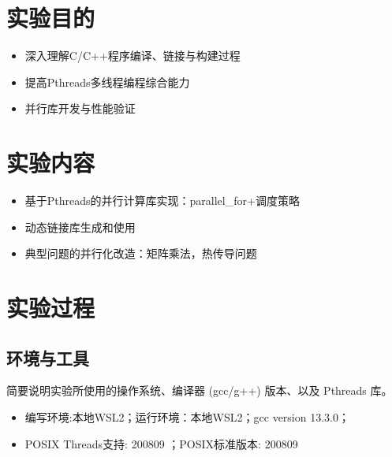 \documentclass{SYSUReport}
\date{2025年5月10日}
\begin{document}
\cover
\thispagestyle{empty} %
\clearpage



\section{实验目的}
\begin{itemize}
  \item 深入理解C/C++程序编译、链接与构建过程
\item 提高Pthreads多线程编程综合能力
\item 并行库开发与性能验证
\end{itemize}

\section{实验内容}
\begin{itemize}
 \item 基于Pthreads的并行计算库实现：parallel\_for+调度策略
\item 动态链接库生成和使用
\item  典型问题的并行化改造：矩阵乘法，热传导问题
\end{itemize}

\section{实验过程}

\subsection{环境与工具}
简要说明实验所使用的操作系统、编译器 (gcc/g++) 版本、以及 Pthreads 库。
\begin{itemize}
    \item 编写环境:本地WSL2；运行环境：本地WSL2；gcc version 13.3.0；
    \item POSIX Threads支持: 200809
；POSIX标准版本: 200809
\end{itemize}
\end{document}
